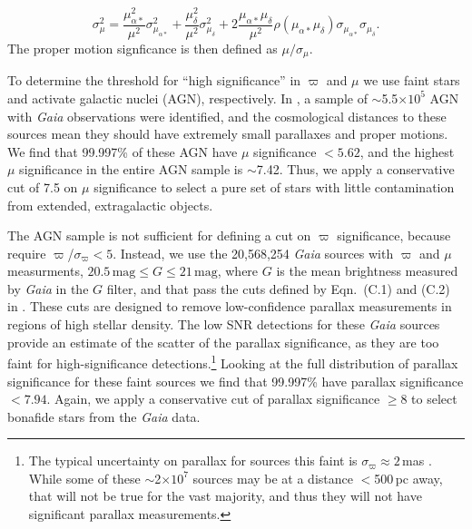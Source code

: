 \documentclass[twocolumn, dvipdfmx]{aastex62}
\begin{document}
\begin{CJK*}{UTF8}{gbsn}
%
$$ \sigma_\mu^2 = \frac{\mu_{\alpha\ast}^2}{\mu^2}\sigma_{\mu_{\alpha\ast}}^2 +
\frac{\mu_{\delta}^2}{\mu^2}\sigma_{\mu_{\delta}}^2 +
2\frac{\mu_{\alpha\ast}\mu_{\delta}}{\mu^2} \rho(\mu_{\alpha\ast}\mu_{\delta})
\sigma_{\mu_{\alpha\ast}}\sigma_{\mu_{\delta}}.$$
%
The proper motion signficance is then defined as $\mu/\sigma_\mu$.

To determine the threshold for ``high significance'' in $\varpi$ and $\mu$
we use faint stars and activate galactic nuclei (AGN), respectively. In
\citet{Lindegren18}, a sample of $\sim$5.5$\times10^{5}$ AGN with
\textit{Gaia} observations were identified, and the cosmological distances
to these sources mean they should have extremely small parallaxes and proper
motions. We find that 99.997\% of these AGN have $\mu$ significance $<
5.62$, and the highest $\mu$ significance in the entire AGN sample is
$\sim$7.42. Thus, we apply a conservative cut of 7.5 on $\mu$ significance
to select a pure set of stars with little contamination from extended,
extragalactic objects.

The AGN sample is not sufficient for defining a cut on $\varpi$ significance,
because \citet{Lindegren18} require $\varpi$/$\sigma_\varpi < 5$. Instead,
we use the 20,568,254 \textit{Gaia} sources with $\varpi$ and $\mu$
measurments, $20.5\,\mathrm{mag} \le G \le 21\,\mathrm{mag}$, where $G$ is
the mean brightness measured by \textit{Gaia} in the $G$ filter, and that
pass the cuts defined by Eqn.~(C.1) and (C.2) in \citet{Lindegren18}. These
cuts are designed to remove low-confidence parallax measurements in regions
of high stellar density. The low SNR detections for these \textit{Gaia}
sources provide an estimate of the scatter of the parallax significance, as
they are too faint for high-significance detections.\footnote{The typical
uncertainty on parallax for sources this faint is $\sigma_\varpi \approx
2$\,mas \citep{Lindegren18}. While some of these $\sim$2$\times10^7$ sources
may be at a distance $<$500\,pc away, that will not be true for the vast
majority, and thus they will not have significant parallax measurements.}
Looking at the full distribution of parallax significance for these faint
sources we find that 99.997\% have parallax significance $< 7.94$. Again, we
apply a conservative cut of parallax significance $\ge$8 to select bonafide
stars from the \textit{Gaia} data.


\end{CJK*}
\end{document}
